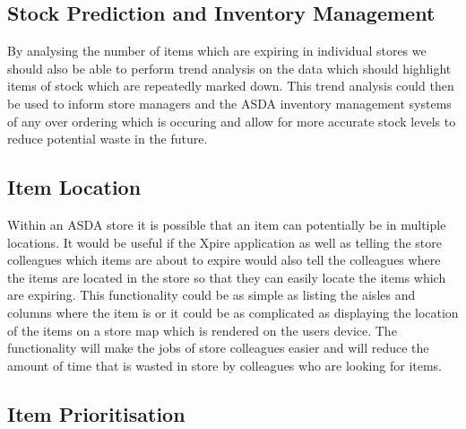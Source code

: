 \documentclass[a4paper,11pt]{report}
\begin{document}
\subsection{Stock Prediction and Inventory Management}

By analysing the number of items which are expiring in individual stores we should also be able to perform trend 
analysis on the data which should highlight items of stock which are repeatedly marked down. This trend analysis 
could then be used to inform store managers and the ASDA inventory management systems of any over ordering which is 
occuring and allow for more accurate stock levels to reduce potential waste in the future.

\subsection{Item Location}
Within an ASDA store it is possible that an item can potentially be in multiple locations. It would be useful if the Xpire application as well as telling the store colleagues which items are about to expire would also tell the colleagues where the items are located in the store so that they can easily locate the items which are expiring. 
This functionality could be as simple as listing the aisles and columns where the item is or it could be as complicated as displaying the location of the items on a store map which is rendered on the users device. The functionality will make the jobs of store colleagues easier and will reduce the amount of time that is wasted in store by colleagues who are looking for items. 

\subsection{Item Prioritisation}




\end{document}
